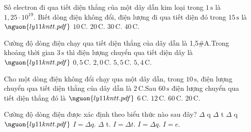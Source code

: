 \begin{ex}
Số electron đi qua tiết diện thẳng của một dây dẫn kim loại trong $1\,\mathrm{s}$ là $1,25\cdot 10^{19}$. Biết dòng điện không đổi, điện lượng đi qua tiết diện đó trong $15\,\mathrm{s}$ là $\nguon{ly11 kntt.pdf}$
\choice
{$10\,\mathrm{C}$.}
{$20\,\mathrm{C}$.}
{\True $30\,\mathrm{C}$.}
{$40\,\mathrm{C}$.}
\end{ex}

\begin{ex}
Cường độ dòng điện chạy qua tiết diện thẳng của dây dẫn là 1,5#A.Trong khoảng thời gian $3\,\mathrm{s}$ thì điện lượng chuyển qua tiết diện dây là $\nguon{ly11 kntt.pdf}$
\choice
{$0,5\,\mathrm{C}$.}
{$2,0\,\mathrm{C}$.}
{\True $5,5\,\mathrm{C}$.}
{$5,4\,\mathrm{C}$.}
\end{ex}

\begin{ex}
Cho một dòng điện không đổi chạy qua một dây dẫn, trong $10\,\mathrm{s}$, điện lượng chuyển qua tiết diện thẳng của dây dẫn là $2\,\mathrm{C}$.Sau $60\,\mathrm{s}$ điện lượng chuyển qua tiết diện thẳng đó là $\nguon{ly11 kntt.pdf}$
\choice
{$6\,\mathrm{C}$.}
{\True $12\,\mathrm{C}$.}
{$60\,\mathrm{C}$.}
{$20\,\mathrm{C}$.}
\end{ex}

\begin{ex}
Cường độ dòng điện được xác định theo biểu thức nào sau đây? $\Delta$ q $\Delta$ t $\Delta$ q $\nguon{ly11 kntt.pdf}$
\choice
{$I = \Delta q$. $\Delta$ t.}
{\True $I = \Delta t$.}
{$I = \Delta q$.}
{$I = e$.}
\end{ex}
